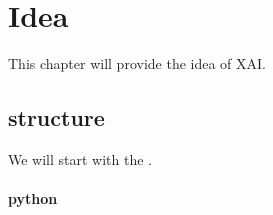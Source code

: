 \chapter{Idea}

This chapter will provide the idea of XAI.

\section{structure} %
\label{sec:atom}
We will start with the .

\subsubsection{python} %
\label{ssub:h}



